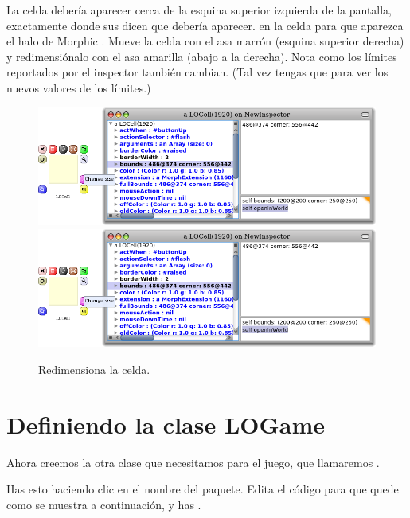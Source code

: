 \documentclass[a4paper,10pt,twoside]{book}
\begin{document}
La celda deber\'ia aparecer cerca de la esquina superior izquierda de la pantalla, exactamente donde sus  dicen que deber\'ia aparecer. 
\metaclick en la celda para que aparezca el halo de Morphic . %
Mueve la celda con el asa marr\'on (esquina superior derecha) y redimensi\'onalo con el asa amarilla (abajo a la derecha).
Nota como los l\'imites reportados por el inspector tambi\'en cambian. 
(Tal vez tengas que \actclick{}  para ver los nuevos valores de los l\'imites.)

\begin{figure}[htbp]
\centering
\ifluluelse
	{\includegraphics[width=\textwidth]{LOCellResize} }
	{\includegraphics[scale=0.7]{LOCellResize} }
\caption{Redimensiona la celda.}
\end{figure}


\section{Definiendo la clase LOGame}

Ahora creemos la otra clase que necesitamos para el juego, que llamaremos .

Has esto haciendo clic en el nombre del paquete.
Edita el c\'odigo para que quede como se muestra a continuaci\'on, y has .
\end{document}

